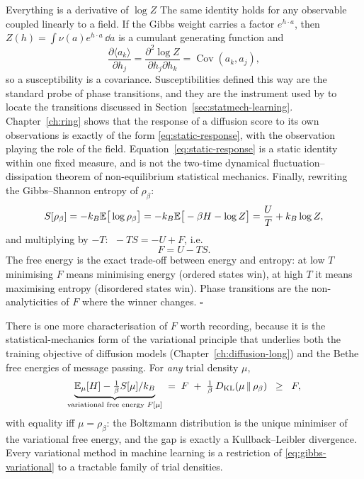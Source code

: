\begin{toolbox}{Everything is a derivative of $\log Z$}
The same identity holds for any observable coupled linearly to a field. If the
Gibbs weight carries a factor $e^{h \cdot a}$, then
$Z(h) = \int \nu(a) e^{h\cdot a}\,\dd a$ is a cumulant generating function and
\begin{equation}
  \frac{\partial \langle a_k \rangle}{\partial h_j}
  = \frac{\partial^2 \log Z}{\partial h_j \partial h_k}
  = \operatorname{Cov}(a_k, a_j) ,
  \label{eq:static-response}
\end{equation}
so a susceptibility is a covariance. Susceptibilities defined this way are the
standard probe of phase transitions, and they are the instrument used by
\citet{bachtis2024cascade} to locate the transitions discussed in
Section~\ref{sec:statmech-learning}. Chapter~\ref{ch:ring} shows that the
response of a diffusion score to its own observations is exactly of the form
\eqref{eq:static-response}, with the observation playing the role of the field.
Equation~\eqref{eq:static-response} is a static identity within one fixed
measure, and is not the two-time dynamical fluctuation--dissipation theorem of
non-equilibrium statistical mechanics.
Finally, rewriting the Gibbs--Shannon entropy of $\rho_\beta$:
\begin{equation*}
  S[\rho_\beta]
  = -k_B \mathbb{E}\big[\log \rho_\beta\big]
  = -k_B \mathbb{E}\big[-\beta H - \log Z\big]
  = \frac{U}{T} + k_B \log Z ,
\end{equation*}
and multiplying by $-T$: $\; -TS = -U + F$, i.e.
\begin{equation*}
  F = U - TS .
\end{equation*}
The free energy is the exact trade-off between energy and entropy: at low
$T$ minimising $F$ means minimising energy (ordered states win), at high
$T$ it means maximising entropy (disordered states win). Phase
transitions are the non-analyticities of $F$ where the winner changes.
\hfill$\square$
\end{toolbox}

There is one more characterisation of $F$ worth recording, because it is
the statistical-mechanics form of the variational principle that
underlies both the training objective of diffusion models
(Chapter~\ref{ch:diffusion-long}) and the Bethe free energies of message
passing. For \emph{any} trial density $\mu$,
\begin{equation}
  \underbrace{\mathbb{E}_\mu[H] - \tfrac{1}{\beta} S[\mu]/k_B}_{\text{variational free energy } F[\mu]}
  \;=\; F \;+\; \tfrac{1}{\beta}\, D_{\mathrm{KL}}\!\left(\mu \,\|\, \rho_\beta\right)
  \;\;\geq\;\; F ,
  \label{eq:gibbs-variational}
\end{equation}
with equality iff $\mu = \rho_\beta$: the Boltzmann distribution is the
unique minimiser of the variational free energy, and the gap is exactly a
Kullback--Leibler divergence. Every variational method in machine
learning is a restriction of \eqref{eq:gibbs-variational} to a tractable
family of trial densities.


